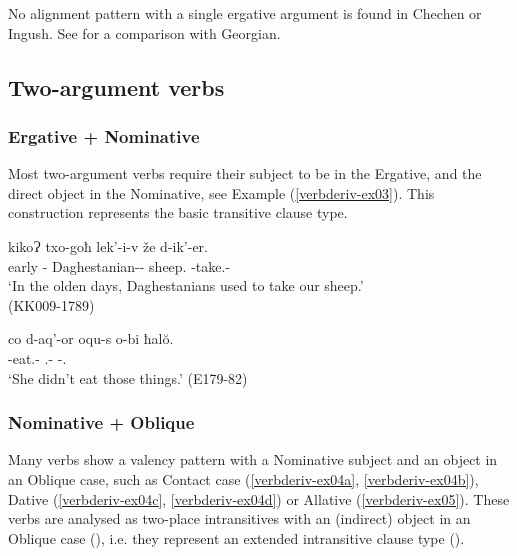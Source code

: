 No alignment pattern with a single ergative argument is found in Chechen or Ingush. See  for a comparison with Georgian.


\subsection{Two-argument verbs} \label{2arg}

\subsubsection{Ergative + Nominative}

Most two-argument verbs require their subject to be in the Ergative, and the direct object in the Nominative, see Example (\ref{verbderiv-ex03}). This construction represents the basic transitive clause type.

\begin{exe}
	\ex\label{verbderiv-ex03}
	\begin{xlist}
		
		
			\ex\label{verbderiv-ex03a}
			\gll kikoɁ txo-goħ lek'-i-v že d-ik'-er. \\
			early {\Fpl}-{\Adess} Daghestanian-{\Pl}-\textbf{{\Erg}} sheep.\textbf{{\Nom}} {\D}-take.{\Anim}-{\Imprf}\\
			\trans `In the olden days, Daghestanians used to take our sheep.' \\
			\hfill (KK009-1789)
		
		
		
			\ex\label{verbderiv-ex03b}
			\gll co d-aq'-or oqu-s o-bi ħal\u{o}.  \\
			{\Neg} {\D}-eat.{\Ipfv}-{\Imprf} {\Dist}.{\Obl}-\textbf{{\Erg}} {\Dist}-{\Pl}.\textbf{{\Nom}} {\Pv} \\
			\trans `She didn't eat those things.'
			\hfill (E179-82)
		
		
	\end{xlist}
\end{exe}


\subsubsection{Nominative + Oblique}

Many verbs show a valency pattern with a Nominative subject and an object in an Oblique case, such as Contact case (\ref{verbderiv-ex04a}, \ref{verbderiv-ex04b}), Dative (\ref{verbderiv-ex04c}, \ref{verbderiv-ex04d}) or Allative (\ref{verbderiv-ex05}). These verbs are analysed as two-place intransitives with an (indirect) object in an Oblique case (\cite[193]{holiskygagua}), i.e. they represent an extended intransitive clause type (\cites[]{dixonaikh2000intro}).

